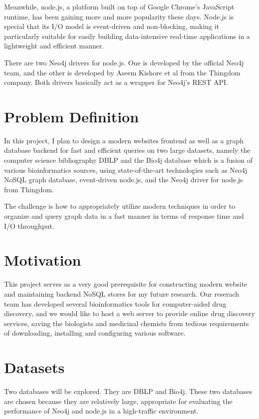 \documentclass[10pt, conference, compsocconf]{IEEEtran}
\begin{document}
Meanwhile, node.js, a platform built on top of Google Chrome's JavaScript runtime, has been gaining more and more popularity these days. Node.js is special that its I/O model is event-driven and non-blocking, making it particularly suitable for easily building data-intensive real-time applications in a lightweight and efficient manner. 

There are two Neo4j drivers for node.js. One is developed by the official Neo4j team, and the other is developed by Aseem Kishore et al from the Thingdom company. Both drivers basically act as a wrapper for Neo4j's REST API.

\section{Problem Definition}

In this project, I plan to design a modern websites frontend as well as a graph database backend for fast and efficient queries on two large datasets, namely the computer science bibliography DBLP \citep{ley2006maintaining,Ley:2009:DLL:1687553.1687577} and the Bio4j database which is a fusion of various bioinformatics sources, using state-of-the-art technologies such as Neo4j NoSQL graph database, event-driven node.js, and the Neo4j driver for node.js from Thingdom.

The challenge is how to appropriately utilize modern techniques in order to organize and query graph data in a fast manner in terms of response time and I/O throughput.

\section{Motivation}

This project serves as a very good prerequisite for constructing modern website and maintaining backend NoSQL stores for my future research. Our reserach team has developed several bioinformatics tools for computer-aided drug discovery, and we would like to host a web server to provide online drug discovery services, saving the biologists and medicinal chemists from tedious requirements of downloading, installing and configuring various software.

\section{Datasets}

Two databases will be explored. They are DBLP and Bio4j. These two databases are chosen because they are relatively large, appropriate for evaluating the performance of Neo4j and node.js in a high-traffic environment.
\end{document}

